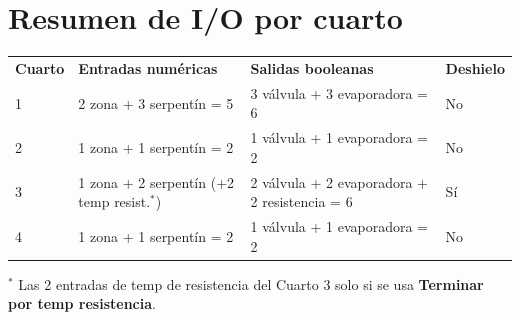 \documentclass[11pt,a4paper]{article}
\newcommand{\slot}[1]{\textbf{#1}}
\newcommand{\cabfila}{\color{white}\bfseries}
\begin{document}
\section{Resumen de I/O por cuarto}
\begin{center}\small
{}
\begin{tabular}{L{1.6cm} L{4.4cm} L{5.0cm} L{1.8cm}}
\cabfila \textbf{Cuarto} & \cabfila \textbf{Entradas numéricas} & \cabfila \textbf{Salidas booleanas} & \cabfila \textbf{Deshielo} \\
1 & 2 zona + 3 serpentín = 5 & 3 válvula + 3 evaporadora = 6 & No \\
2 & 1 zona + 1 serpentín = 2 & 1 válvula + 1 evaporadora = 2 & No \\
3 & 1 zona + 2 serpentín (+2 temp resist.$^\ast$) & 2 válvula + 2 evaporadora + 2 resistencia = 6 & Sí \\
4 & 1 zona + 1 serpentín = 2 & 1 válvula + 1 evaporadora = 2 & No \\
\end{tabular}
\end{center}
\begin{nota}$^\ast$ Las 2 entradas de temp de resistencia del Cuarto 3 solo si se usa \slot{Terminar por temp resistencia}.\end{nota}
\end{document}
